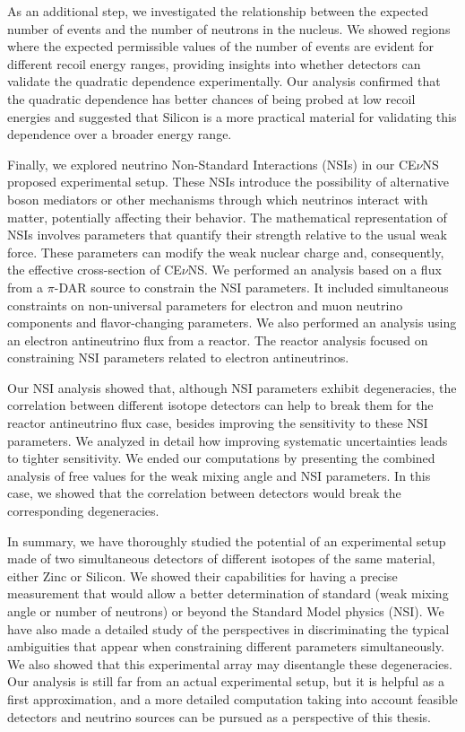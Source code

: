 As an additional step, we investigated the relationship between the expected number of events and the number of neutrons in the nucleus. We showed regions where the expected permissible values of the number of events are evident for different recoil energy ranges, providing insights into whether detectors can validate the quadratic dependence experimentally.
Our analysis confirmed that the quadratic dependence has better chances of being probed at low recoil energies and suggested that Silicon is a more practical material for validating this dependence over a broader energy range.

Finally, we explored neutrino Non-Standard Interactions (NSIs) in our CE$\nu$NS proposed experimental setup.
These NSIs introduce the possibility of alternative boson mediators or other mechanisms through which neutrinos interact with matter, potentially affecting their behavior. The mathematical representation of NSIs involves parameters that quantify their strength relative to the usual weak force. These parameters can modify the weak nuclear charge and, consequently, the effective cross-section of CE$\nu$NS.  We performed an analysis based on a flux from a $\pi$-DAR source to constrain the NSI parameters. It included simultaneous constraints on non-universal parameters for electron and muon neutrino components and flavor-changing parameters. We also performed an analysis using an electron antineutrino flux from a reactor. The reactor analysis focused on constraining NSI parameters related to electron antineutrinos.

Our NSI analysis showed that, although NSI parameters exhibit degeneracies, the correlation between different isotope detectors can help to break them for the reactor antineutrino flux case, besides improving the sensitivity to these NSI parameters. 
We analyzed in detail how improving systematic uncertainties leads to tighter sensitivity. We ended our computations by presenting the combined analysis of free values for the weak mixing angle and NSI parameters. In this case, we showed that the correlation between detectors would break the corresponding degeneracies.

In summary, we have thoroughly studied the potential of an experimental
setup made of two simultaneous detectors of different isotopes of
the same material, either Zinc or Silicon. We showed their
capabilities for having a precise measurement that would allow a
better determination of standard (weak mixing angle or number of
neutrons) or beyond the Standard Model physics (NSI). We have also
made a detailed study of the perspectives in discriminating the
typical ambiguities that appear when constraining different parameters
simultaneously. We also showed that this experimental array may
disentangle these degeneracies. Our analysis is still far from an
actual experimental setup, but it is helpful as a first approximation,
and a more detailed computation taking into account feasible detectors
and neutrino sources can be pursued as a perspective of this thesis.





